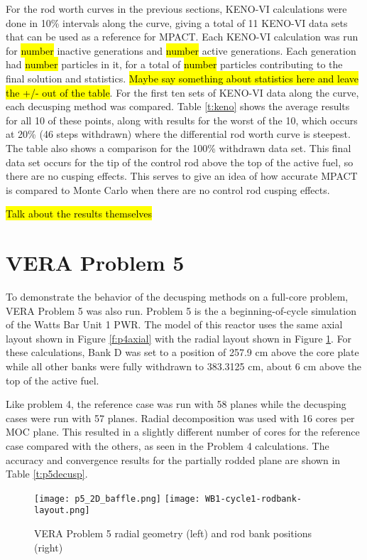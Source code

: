 For the rod worth curves in the previous sections, KENO-VI calculations were done in 10\% intervals along the curve, giving a total of 11 KENO-VI data sets that can be used as a reference for MPACT.  Each KENO-VI calculation was run for \hl{number} inactive generations and \hl{number} active generations.  Each generation had \hl{number} particles in it, for a total of \hl{number} particles contributing to the final solution and statistics.  \hl{Maybe say something about statistics here and leave the +/- out of the table}.  For the first ten sets of KENO-VI data along the curve, each decusping method was compared.  Table \ref{t:keno} shows the average results for all 10 of these points, along with results for the worst of the 10, which occurs at 20\% (46 steps withdrawn) where the differential rod worth curve is steepest.  The table also shows a comparison for the 100\% withdrawn data set.  This final data set occurs for the tip of the control rod above the top of the active fuel, so there are no cusping effects.  This serves to give an idea of how accurate MPACT is compared to Monte Carlo when there are no control rod cusping effects.

\hl{Talk about the results themselves}

\section{VERA Problem 5}

To demonstrate the behavior of the decusping methods on a full-core problem, VERA Problem 5 was also run.  Problem 5 is the a beginning-of-cycle simulation of the Watts Bar Unit 1 PWR.  The model of this reactor uses the same axial layout shown in Figure \ref{f:p4axial} with the radial layout shown in Figure \ref{f:p5radial}.  For these calculations, Bank D was set to a position of 257.9 cm above the core plate while all other banks were fully withdrawn to 383.3125 cm, about 6 cm above the top of the active fuel.

Like problem 4, the reference case was run with 58 planes while the decusping cases were run with 57 planes.  Radial decomposition was used with 16 cores per MOC plane.  This resulted in a slightly different number of cores for the reference case compared with the others, as seen in the Problem 4 calculations.  The accuracy and convergence results for the partially rodded plane are shown in Table \ref{t:p5decusp}.

\begin{figure}[h]
\centering
\texttt{[image: p5\_2D\_baffle.png]}
\hfill
\texttt{[image: WB1-cycle1-rodbank-layout.png]}
\caption{VERA Problem 5 radial geometry (left) and rod bank positions (right)}\label{f:p5radial}
\end{figure}


